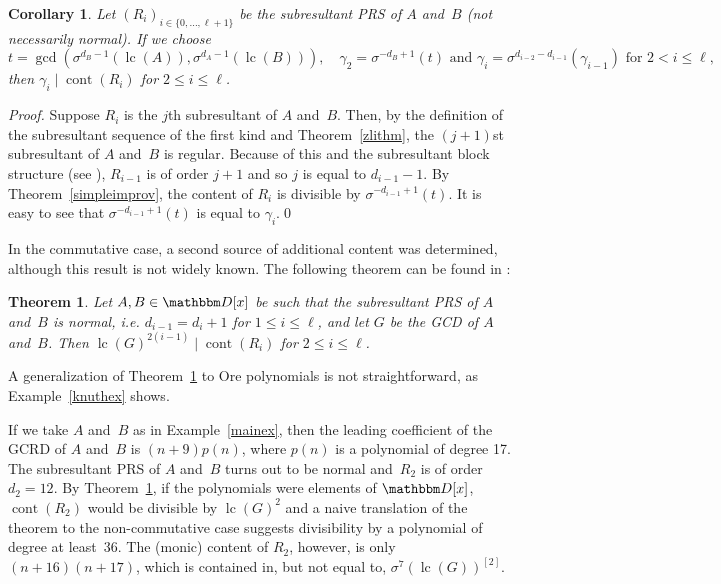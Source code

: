 \documentclass[3p,11pt,preprint]{elsarticle}
\newtheorem{theorem}{Theorem}
\newtheorem{corollary}{Corollary}
\let\set\mathbbm
\def\k{\set D}
\newcommand{\D}{x}
\newcommand{\lc}{\operatorname{lc}}
\newcommand{\cont}{\operatorname{cont}}
\newcommand{\prs}[3]{(#1_i)_{i\in \{#2,\dots,#3\}}}
\begin{document}
\begin{corollary}
\label{cor1}
  Let $\prs{R}{0}{\ell+1}$ be the subresultant PRS of $A$ and~$B$ (not necessarily normal). If we choose \[t=\gcd(\sigma^{d_B-1}(\lc(A)),\sigma^{d_A-1}(\lc(B))),\quad \gamma_2 = \sigma^{-d_B+1}(t)\text{ and }\gamma_i=\sigma^{d_{i-2}-d_{i-1}}(\gamma_{i-1})\text{ for } 2<i\leq\ell,\] then $\gamma_i\mid\cont(R_i)$ for $2\leq i\leq\ell$.
\end{corollary}
\begin{proof}
 Suppose $R_i$ is the $j$th subresultant of $A$ and~$B$. Then, by the definition of the subresultant sequence of the first kind and Theorem~\ref{zlithm}, the $(j+1)$st subresultant of $A$ and~$B$ is regular. Because of this and the subresultant block structure (see \cite{zli}), $R_{i-1}$ is of order $j+1$ and so $j$ is equal to $d_{i-1}-1$. By Theorem~\ref{simpleimprov}, the content of $R_i$ is divisible by $\sigma^{-d_{i-1}+1}(t)$. 
 It is easy to see that $\sigma^{-d_{i-1}+1}(t)$ is equal to $\gamma_i$.\qed
\end{proof}

In the commutative case, a second source of additional content was determined, although this result is not widely known. The following theorem can be found in \cite{knuth}:

\begin{theorem}
\label{knuththm}
 Let $A,B\in \k[\D]$ be such that the subresultant PRS of $A$ and~$B$ is normal, i.e. $d_{i-1} = d_i+1$ for $1\leq i \leq \ell$, and let $G$ be the GCD of $A$ and~$B$. Then $\lc(G)^{2(i-1)}\mid \cont(R_i)$ for $2\leq i\leq \ell$.
\end{theorem}

A generalization of Theorem~\ref{knuththm} to Ore polynomials is not straightforward, as Example~\ref{knuthex} shows.

\begin{example}
 \label{knuthex}
If we take $A$ and~$B$ as in Example~\ref{mainex}, then the leading coefficient of the GCRD of $A$ and~$B$ is $(n+9)p(n)$,
where $p(n)$ is a polynomial of degree 17. The subresultant PRS of $A$ and~$B$ turns out to be normal and~$R_2$ is of order $d_2 = 12$. By Theorem~\ref{knuththm}, if the polynomials were elements of $\k[\D]$, $\cont(R_2)$ would be divisible by $\lc(G)^2$ and a naive translation of the theorem to the non-commutative case suggests divisibility by a polynomial of degree at least~36. The (monic) content of $R_2$, however, is only $(n+16)(n+17) $, which is contained in, but not equal to, $\sigma^{7}(\lc(G))^{[2]}$.
\end{example}
\end{document}
